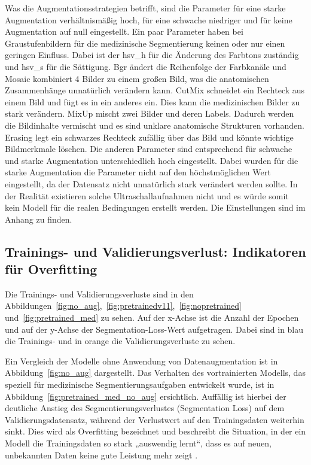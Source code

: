 \documentclass[
	german,
	accentcolor=10c,%
	type=intern,
	marginpar=false
	]{tudapub}
\begin{document}
Was die Augmentationsstrategien betrifft, sind die Parameter für eine starke Augmentation verhältnismäßig hoch, für eine schwache niedriger und für keine Augmentation auf null eingestellt. Ein paar Parameter haben bei Graustufenbildern für die medizinische Segmentierung keinen oder nur einen geringen Einfluss. Dabei ist der hsv\_h für die Änderung des Farbtons zuständig und hsv\_s für die Sättigung. Bgr ändert die Reihenfolge der Farbkanäle und Mosaic kombiniert 4 Bilder zu einem großen Bild, was die anatomischen Zusammenhänge unnatürlich verändern kann. CutMix schneidet ein Rechteck aus einem Bild und fügt es in ein anderes ein. Dies kann die medizinischen Bilder zu stark verändern. MixUp mischt zwei Bilder und deren Labels. Dadurch werden die Bildinhalte vermischt und es sind unklare anatomische Strukturen vorhanden. Erasing legt ein schwarzes Rechteck zufällig über das Bild und könnte wichtige Bildmerkmale löschen. Die anderen Parameter sind entsprechend für schwache und starke Augmentation unterschiedlich hoch eingestellt. Dabei wurden für die starke Augmentation die Parameter nicht auf den höchstmöglichen Wert eingestellt, da der Datensatz nicht unnatürlich stark verändert werden sollte. In der Realität existieren solche Ultraschallaufnahmen nicht und es würde somit kein Modell für die realen Bedingungen erstellt werden. Die Einstellungen sind im Anhang zu finden.

\subsection{Trainings- und Validierungsverlust: Indikatoren für Overfitting}\label{sec:Trainings- und Validierungsverlust: Indikatoren für Overfitting}

Die Trainings- und Validierungsverluste sind in den Abbildungen~\ref{fig:no_aug},~\ref{fig:pretrainedv11},~\ref{fig:nopretrained} und~\ref{fig:pretrained_med} zu sehen. Auf der x-Achse ist die Anzahl der Epochen und auf der y-Achse der Segmentation-Loss-Wert aufgetragen. Dabei sind in blau die Trainings- und in orange die Validierungsverluste zu sehen.

Ein Vergleich der Modelle ohne Anwendung von Datenaugmentation ist in Abbildung~\ref{fig:no_aug} dargestellt. Das Verhalten des vortrainierten Modells, das speziell für medizinische Segmentierungsaufgaben entwickelt wurde, ist in Abbildung~\ref{fig:pretrained_med_no_aug} ersichtlich. Auffällig ist hierbei der deutliche Anstieg des Segmentierungsverlustes (Segmentation Loss) auf dem Validierungsdatensatz, während der Verlustwert auf den Trainingsdaten weiterhin sinkt. Dies wird als Overfitting bezeichnet und beschreibt die Situation, in der ein Modell die Trainingsdaten so stark „auswendig lernt“, dass es auf neuen, unbekannten Daten keine gute Leistung mehr zeigt \cite{dietterich1995overfitting}.
\end{document}
